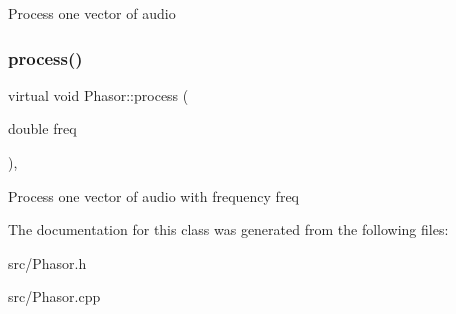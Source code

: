 Process one vector of audio \mbox{\label{class_phasor_aa6a31e512e0f60497cc86de4467c33ef}} 
\subsubsection{\texorpdfstring{process()}{process()}\hspace{0.1cm}{\footnotesize\ttfamily [2/2]}}
{\footnotesize\ttfamily virtual void Phasor\+::process (\begin{DoxyParamCaption}\item[{double}]{freq }\end{DoxyParamCaption})\hspace{0.3cm}{\ttfamily [inline]}, {\ttfamily [virtual]}}

Process one vector of audio with frequency freq 

The documentation for this class was generated from the following files\+:\begin{DoxyCompactItemize}
\item 
src/Phasor.\+h\item 
src/Phasor.\+cpp\end{DoxyCompactItemize}

